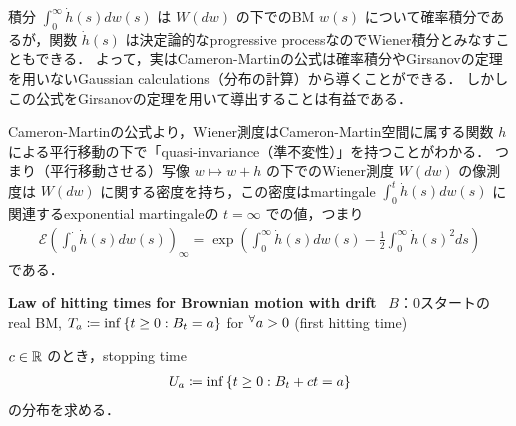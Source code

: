 \documentclass{jsarticle}
\begin{document}
\begin{remark*}
    積分 $\int_0^\infty\dot{h}(s)dw(s)$ は $W(dw)$ の下でのBM $w(s)$ について確率積分であるが，関数 $\dot{h}(s)$ は決定論的なprogressive processなのでWiener積分とみなすこともできる．
    よって，実はCameron-Martinの公式は確率積分やGirsanovの定理を用いないGaussian calculations（分布の計算）から導くことができる．
    しかしこの公式をGirsanovの定理を用いて導出することは有益である．

    Cameron-Martinの公式より，Wiener測度はCameron-Martin空間に属する関数 $h$ による平行移動の下で「quasi-invariance（準不変性）」を持つことがわかる．
    つまり（平行移動させる）写像 $w\mapsto w+h$ の下でのWiener測度 $W(dw)$ の像測度は $W(dw)$ に関する密度を持ち\nazo，この密度はmartingale $\int_0^t \dot{h}(s)dw(s)$ に関連するexponential martingaleの $t=\infty$ での値，つまり
    \begin{align}
        \mathcal{E}\left(\int_0^{\cdot}\dot{h}(s)dw(s)\right)_\infty
        = \exp\left(\int_0^\infty \dot{h}(s)dw(s)-\frac{1}{2}\int_0^\infty \dot{h}(s)^2 ds\right)
    \end{align}
    である．
\end{remark*}
\hrulefill

\textbf{Law of hitting times for Brownian motion with drift}~
$B$：0スタートのreal BM, $T_a\coloneqq\inf\left\{t\ge0:B_t=a\right\}$ for ${}^{\forall} a>0$ (first hitting time)

$c\in\mathbb{R}$ のとき，stopping time
\begin{align}
    U_a\coloneqq\inf\left\{t\ge0:B_t+ct=a\right\}
\end{align}
の分布を求める．
\end{document}
